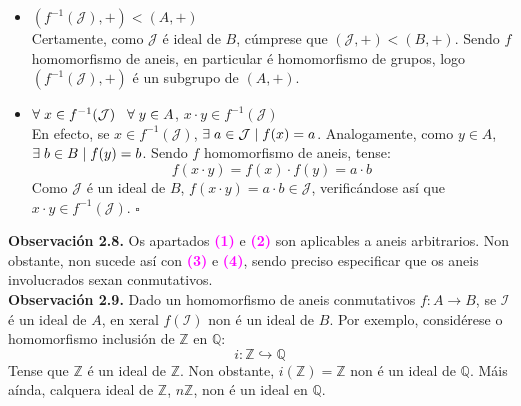 \documentclass[twoside]{report}
\newcommand{\magbf}[1]{\textcolor{magenta}{\textbf{#1}}} %
\theoremstyle{mystyle}
\begin{document}
\begin{itemize}
    \item $(f^{-1}(\mathcal{J}), +) < (A, +)$\\
    
    Certamente, como $\mathcal{J}$ é ideal de $B$, cúmprese que $(\mathcal{J},+) < (B, +)$. Sendo $f$ homomorfismo de aneis, en particular é homomorfismo de grupos, logo $(f^{-1}(\mathcal{J}), +)$ é un subgrupo de $(A, +)$.\\
    
    \item $\forall \hspace{1mm} x\in f^{-1}(\mathcal{J}) \hspace{3mm} \forall \hspace{1mm} y \in A$, $x \cdot y \in f^{-1}(\mathcal{J})$\\
    
    En efecto, se $x \in f^{-1}(\mathcal{J})$, $\exists \hspace{1mm} a \in \mathcal{J} \hspace{1mm} | \hspace{1mm} f(x) = a$. Analogamente, como $y \in A$, $\exists \hspace{1mm} b \in B \hspace{1mm} | \hspace{1mm} f(y) = b$. Sendo $f$ homomorfismo de aneis, tense:
    $$f(x \cdot y) = f(x) \cdot f(y) = a \cdot b$$
    Como $\mathcal{J}$ é un ideal de $B$, $f(x \cdot y) = a \cdot b \in \mathcal{J}$, verificándose así que $x \cdot y \in f^{-1}(\mathcal{J})$. $\square$\\
\end{itemize}

\noindent \textbf{Observación 2.8.} Os apartados \magbf{(1)} e \magbf{(2)} son aplicables a aneis arbitrarios. Non obstante, non sucede así con \magbf{(3)} e \magbf{(4)}, sendo preciso especificar que os aneis involucrados sexan conmutativos.\\

\noindent \textbf{Observación 2.9.} Dado un homomorfismo de aneis conmutativos $f: A \longrightarrow B$, se $\mathcal{I}$ é un ideal de $A$, en xeral $f(\mathcal{I})$ non é un ideal de $B$. Por exemplo, considérese o homomorfismo inclusión de $\mathbb{Z}$ en $\mathbb{Q}$:
$$i : \mathbb{Z} \hookrightarrow \mathbb{Q}$$
\noindent Tense que $\mathbb{Z}$ é un ideal de $\mathbb{Z}$. Non obstante, $i(\mathbb{Z}) = \mathbb{Z}$ non é un ideal de $\mathbb{Q}$. Máis aínda, calquera ideal de $\mathbb{Z}$, $n\mathbb{Z}$, non é un ideal en $\mathbb{Q}$.
\end{document}
